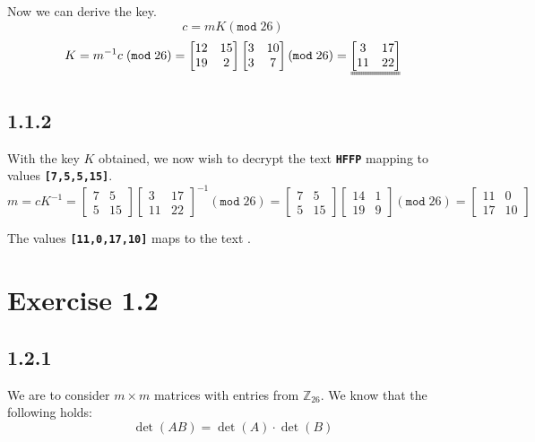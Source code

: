 \documentclass[11pt]{report}
\begin{document}
Now we can derive the key.
$$c = mK (\mathtt{mod}\;26)$$
$$K = m^{-1}c \;(\mathtt{mod}\;26) = \begin{bmatrix}
		12 & 15\\
		19 & 2
	\end{bmatrix} \begin{bmatrix}
		3 & 10\\
		3 & 7
	\end{bmatrix} (\mathtt{mod}\;26) = \uuline{\begin{bmatrix}
		3 & 17\\
		11 & 22
	\end{bmatrix}}$$


\subsection*{1.1.2}
With the key $K$ obtained, we now wish to decrypt the text {\tt\bfseries HFFP} mapping to values {\tt\bfseries [7,5,5,15]}.
$$m = cK^{-1} = \begin{bmatrix}
		7 & 5\\
		5 & 15
	\end{bmatrix} \begin{bmatrix}
		3 & 17\\
		11 & 22
	\end{bmatrix}^{-1} (\mathtt{mod}\;26) = \begin{bmatrix}
		7 & 5\\
		5 & 15
	\end{bmatrix} \begin{bmatrix}
		14 & 1\\
		19 & 9
	\end{bmatrix} (\mathtt{mod}\;26) = \begin{bmatrix}
		11 & 0\\
		17 & 10
	\end{bmatrix}$$

The values {\tt\bfseries [11,0,17,10]} maps to the text .

\newpage

\section*{Exercise 1.2}
\subsection*{1.2.1}
We are to consider $m \times m$ matrices with entries from $\mathbb{Z}_{26}$. We know that the following holds:
$$\det(AB)=\det(A) \cdot \det(B)$$
\end{document}
